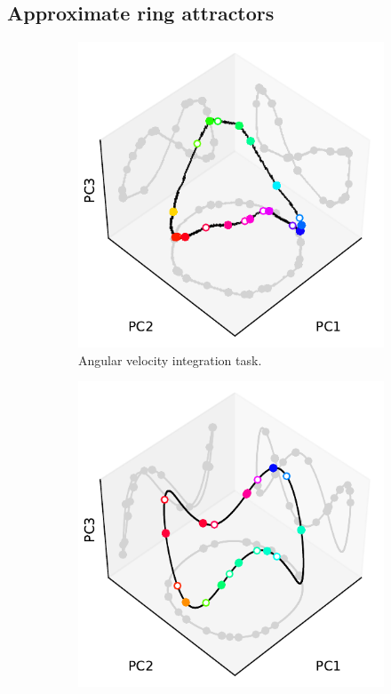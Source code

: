 \documentclass{article}
\newcounter{ct}
\theoremstyle{definition}
\theoremstyle{remark}
\begin{document}
\subsection{Approximate ring attractors}
\begin{figure}[htbp]
    \centering
    \begin{subfigure}[b]{0.45\textwidth}
        \centering
        \includegraphics[width=\textwidth]{figures/angular_N100_recttanh_slow_manifold_3d2d}
        \caption{Angular velocity integration task.}
        \label{fig:slowangular}
    \end{subfigure}
    \quad
    \begin{subfigure}[b]{0.45\textwidth}
        \centering
            \includegraphics[width=\textwidth]{figures/centerout_N100_tanh_slow_manifold_3d2d.pdf}

\end{subfigure}
\end{figure}
\end{document}
